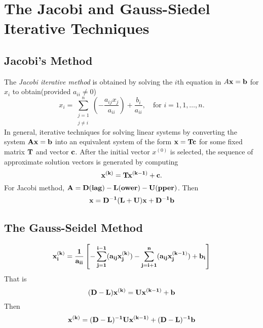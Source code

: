 \section{The Jacobi and Gauss-Siedel Iterative Techniques}
\subsection{Jacobi's Method}
The \emph{Jacobi iterative method} is obtained by solving the $i$th equation in $A\bf x=\mathbf{b}$ for $x_i$ to obtain(provided $a_{ii}\neq 0$)
\[
x_i=\sum_{\substack{j=1\\j\neq i}}^n\left(-\frac{a_{ij}x_j}{a_{ii}}\right)+\frac{b_i}{a_{ii}},\quad\text{for $i=1,1,\ldots,n$}.
\]
In general, iterative techniques for solving linear systems by converting the system $\bf A\bf x=\bf b$ into an equivalent system of the form $\bf x={\bf Tc}$ for some fixed matrix $\bf T$ and vector $\bf c$. After the initial vector $x^{(0)}$ is selected, the sequence of approximate solution vectors is generated by computing
\[
\bf x^{(k)} = {\bf T}\bf x^{(k-1)}+{\bf c}.
\]
For Jacobi method, $\bf A={\bf D}(iag)-{\bf L}(ower)-{\bf U}(pper)$. Then
\[
\bf x = {\bf D}^{-1}({\bf L+U})\bf x + {\bf D}^{-1}{\bf b}
\]

\subsection{The Gauss-Seidel Method}
\[
\bf x_i^{(k)} = \frac{1}{a_{ii}}\left[-\sum_{j=1}^{i-1}(a_{ij}x_j^{(k)})-\sum_{j=i+1}^{n}(a_{ij}x_j^{(k-1)})+b_i\right]
\]
That is
\[
\bf (D-L)x^{(k)} = Ux^{(k-1)} + b
\]
Then
\[
\bf x^{(k)} = (D-L)^{-1}Ux^{(k-1)} + (D-L)^{-1}b
\]

